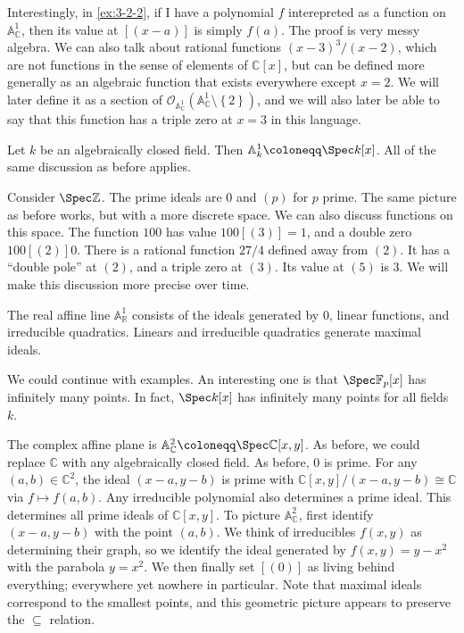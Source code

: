 Interestingly, in \cref{ex:3-2-2}, if I have a polynomial $f$ interepreted as a function on $\mathbb{A} _{\mathbb{C} } ^1$, then its value at $[(x-a)]$ is simply $f(a)$. The proof is very messy algebra. We can also talk about rational functions $(x-3)^3 / (x-2)$, which are not functions in the sense of elements of $\mathbb{C} [x]$, but can be defined more generally as an algebraic function that exists everywhere except $x=2$. We will later define it as a section of $\mathcal{O} _{\mathbb{A} _\mathbb{C} ^1} (\mathbb{A} _{\mathbb{C} } ^1\setminus \left\{ 2 \right\} )$, and we will also later be able to say that this function has a triple zero at $x=3$ in this language.

\begin{example}\label{ex:3-2-3}
	Let $k$ be an algebraically closed field. Then $\mathbb{A} _k^1 \coloneqq \Spec k[x]$. All of the same discussion as before applies.
\end{example}

\begin{example}\label{ex:3-2-4}
	Consider $\Spec\mathbb{Z} $. The prime ideals are $0$ and $(p)$ for $p$ prime. The same picture as before works, but with a more discrete space. We can also discuss functions on this space. The function $100$ has value $100[(3)]=1$, and a double zero $100[(2)]0$. There is a rational function $27 /4$ defined away from $(2)$. It has a ``double pole'' at $(2)$, and a triple zero at $(3)$. Its value at $(5) $ is 3. We will make this discussion more precise over time.
\end{example}

\begin{example}\label{ex:3-2-5}
	The real affine line $\mathbb{A} _{\mathbb{R} } ^1$ consists of the ideals generated by 0, linear functions, and irreducible quadratics. Linears and irreducible quadratics generate maximal ideals.
\end{example}

We could continue with examples. An interesting one is that $\Spec\mathbb{F} _p[x]$ has infinitely many points. In fact, $\Spec k[x]$ has infinitely many points for all fields $k$.

\begin{example}
	The complex affine plane is $\mathbb{A} _{\mathbb{C} } ^2\coloneqq \Spec\mathbb{C} [x,y]$. As before, we could replace $\mathbb{C} $ with any algebraically closed field. As before, 0 is prime. For any $(a,b)\in\mathbb{C} ^2$, the ideal $(x-a,y-b)$ is prime with $\mathbb{C} [x,y]/(x-a,y-b) \cong \mathbb{C} $ via $f\mapsto f(a,b)$. Any irreducible polynomial also determines a prime ideal. This determines all prime ideals of $\mathbb{C} [x,y]$. To picture $\mathbb{A} _{\mathbb{C} } ^2$, first identify $(x-a,y-b)$ with the point $(a,b)$. We think of irreducibles $f(x,y)$ as determining their graph, so we identify the ideal generated by $f(x,y) = y-x^2$ with the parabola $y=x^2$. We then finally set $[(0)]$ as living behind everything; everywhere yet nowhere in particular. Note that maximal ideals correspond to the smallest points, and this geometric picture appears to preserve the $\subseteq $ relation.
\end{example}

